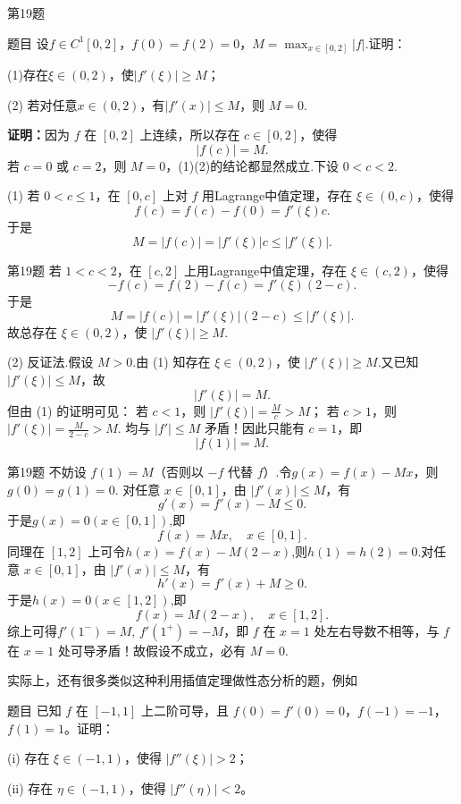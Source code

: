 \documentclass[aspectratio=169]{beamer}
\begin{document}
\begin{frame}{第19题}
\begin{block}{题目}
设$f\in C^1[0,2]$，$f(0)=f(2)=0$，$M=\max_{x\in [0,2]}|f|$.证明：

(1)存在$\xi\in (0,2)$，使$|f'(\xi)|\geqslant M$；

(2) 若对任意$x\in (0,2)$，有$|f'(x)|\leqslant M$，则 $M=0$.
\end{block}
\textbf{证明：}因为 $f$ 在 $[0,2]$ 上连续，所以存在 $c\in[0,2]$，使得
\[
|f(c)|=M.
\]
若 $c=0$ 或 $c=2$，则 $M=0$，(1)(2)的结论都显然成立.下设 $0<c<2$.

(1) 若 $0<c\leqslant 1$，在 $[0,c]$ 上对 $f$ 用Lagrange中值定理，存在 $\xi\in(0,c)$，使得
\[
f(c)=f(c)-f(0)=f'(\xi)c.
\]
于是
\[
M=|f(c)|=|f'(\xi)|c\leqslant |f'(\xi)|.
\]
\end{frame}

\begin{frame}{第19题}
若 $1<c<2$，在 $[c,2]$ 上用Lagrange中值定理，存在 $\xi\in(c,2)$，使得
\[
-f(c)=f(2)-f(c)=f'(\xi)(2-c).
\]
于是
\[
M=|f(c)|=|f'(\xi)|(2-c)\leqslant |f'(\xi)|.
\]
故总存在 $\xi\in (0,2)$，使 $|f'(\xi)|\geqslant M$.

(2) 反证法.假设 $M>0$.由 (1) 知存在 $\xi\in (0,2)$，使 $|f'(\xi)|\geqslant M$.又已知 $|f'(\xi)|\leqslant M$，故
\[
|f'(\xi)|=M.
\]
但由 (1) 的证明可见：
若 $c<1$，则 $|f'(\xi)|=\frac{M}{c}>M$；
若 $c>1$，则 $|f'(\xi)|=\frac{M}{2-c}>M$.
均与 $|f'|\leqslant M$ 矛盾！因此只能有 $c=1$，即
\[
|f(1)|=M.
\]
\end{frame}

\begin{frame}{第19题}
不妨设 $f(1)=M$（否则以 $-f$ 代替 $f$）.令$g(x)=f(x)-Mx$，则$g(0)=g(1)=0$.
对任意 $x\in[0,1]$，由 $|f'(x)|\leqslant M$，有
\[
g'(x)=f'(x)-M\leqslant 0.
\]
于是$g(x)=0(x\in [0,1])$,即
\[
f(x)=Mx,\quad x\in[0,1].
\]
同理在 $[1,2]$ 上可令$h(x)=f(x)-M(2-x)$,则$h(1)=h(2)=0$.对任意 $x\in[0,1]$，由 $|f'(x)|\leqslant M$，有
\[
h'(x)=f'(x)+M\geqslant 0.
\]
于是$h(x)=0(x\in [1,2])$,即
\[
f(x)=M(2-x),\quad x\in[1,2].
\]
综上可得$f'(1^-)=M,\, f'(1^+)=-M$，即
$f$ 在 $x=1$ 处左右导数不相等，与 $f$ 在 $x=1$ 处可导矛盾！故假设不成立，必有 $M=0$.
\end{frame}

\begin{frame}
实际上，还有很多类似这种利用插值定理做性态分析的题，例如
\begin{block}{题目}
已知 $f$ 在 $[-1,1]$ 上二阶可导，且 $f(0) = f'(0) = 0$，$f(-1) = -1$，$f(1) = 1$。证明：

(i) 存在 $\xi \in (-1,1)$，使得 $|f''(\xi)| > 2$；

(ii) 存在 $\eta \in (-1,1)$，使得 $|f''(\eta)| < 2$。 
\end{block}
\end{frame}
\end{document}
